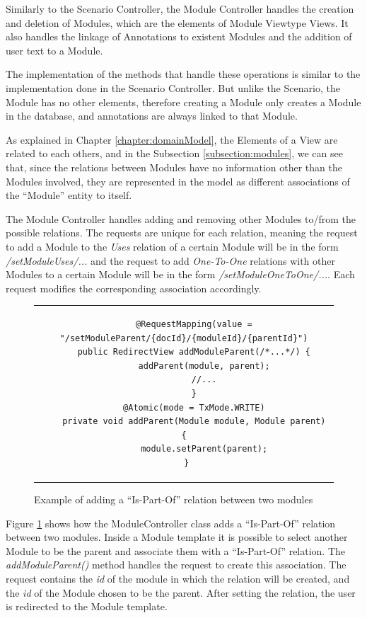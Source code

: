 Similarly to the Scenario Controller, the Module Controller handles the creation and deletion of Modules, which are the elements of Module Viewtype Views. It also handles the linkage of Annotations to existent Modules and the addition of user text to a Module. 

The implementation of the methods that handle these operations is similar to the implementation done in the Scenario Controller. But unlike the Scenario, the Module has no other elements, therefore creating a Module only creates a Module in the database, and annotations are always linked to that Module.

As explained in Chapter \ref{chapter:domainModel}, the Elements of a View are related to each others, and in the Subsection \ref{subsection:modules}, we can see that, since the relations between Modules have no information other than the Modules involved, they are represented in the model as different associations of the ``Module'' entity to itself. 

The Module Controller handles adding and removing other Modules to/from the possible relations. The requests are unique for each relation, meaning the request to add a Module to the \textit{Uses} relation of a certain Module will be in the form \textit{/setModuleUses/...} and the request to add \textit{One-To-One} relations with other Modules to a certain Module will be in the form \textit{/setModuleOneToOne/...}. Each request modifies the corresponding association accordingly.
\begin{figure}[h]
\centering
\lstset{style=customjava}
\begin{tabular}{c}
\begin{lstlisting}
	@RequestMapping(value = "/setModuleParent/{docId}/{moduleId}/{parentId}")
	public RedirectView addModuleParent(/*...*/) {
		addParent(module, parent);
		//...
	}
	@Atomic(mode = TxMode.WRITE)
	private void addParent(Module module, Module parent) {
		module.setParent(parent);
	}	
\end{lstlisting}
\end{tabular}
\caption{Example of adding a ``Is-Part-Of'' relation between two modules}
\label{figure:ModuleControllerIsPartOf}
\end{figure} 

Figure \ref{figure:ModuleControllerIsPartOf} shows how the ModuleController class adds a ``Is-Part-Of'' relation between two modules. Inside a Module template it is possible to select another Module to be the parent and associate them with a ``Is-Part-Of'' relation. The \textit{addModuleParent()} method handles the request to create this association. The request contains the \textit{id} of the module in which the relation will be created, and the \textit{id} of the Module chosen to be the parent. After setting the relation, the user is redirected to the Module template.

